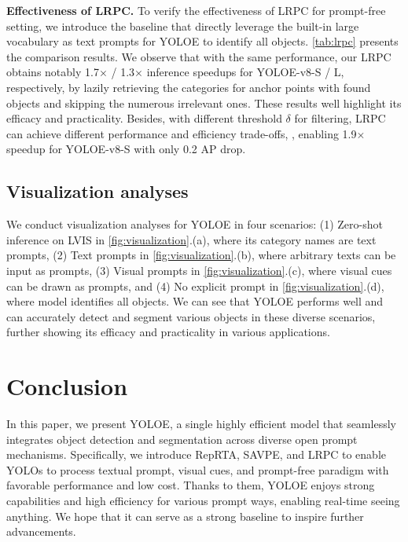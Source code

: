 \documentclass[10pt,twocolumn,letterpaper]{article}
\begin{document}
\textbf{Effectiveness of LRPC.} To verify the effectiveness of LRPC for prompt-free setting, we introduce the baseline that directly leverage the built-in large vocabulary as text prompts for YOLOE to identify all objects. \cref{tab:lrpc} presents the comparison results. We observe that with the same performance, our LRPC obtains notably 1.7$\times$ / 1.3$\times$ inference speedups for YOLOE-v8-S / L, respectively, by lazily retrieving the categories for anchor points with found objects and skipping the numerous irrelevant ones. These results well highlight its efficacy and practicality. Besides, with different threshold $\delta$ for filtering, LRPC can achieve different performance and efficiency trade-offs, \eg, enabling 1.9$\times$ speedup for YOLOE-v8-S with only 0.2 AP drop.

\subsection{Visualization analyses}
We conduct visualization analyses for YOLOE in four scenarios: (1) Zero-shot inference on LVIS in \cref{fig:visualization}.(a), where its category names are text prompts, (2) Text prompts in \cref{fig:visualization}.(b), where arbitrary texts can be input as prompts, (3) Visual prompts in \cref{fig:visualization}.(c), where visual cues can be drawn as prompts, and (4) No explicit prompt in \cref{fig:visualization}.(d), where model identifies all objects. We can see that YOLOE performs well and can accurately detect and segment various objects in these diverse scenarios, further showing its efficacy and practicality in various applications.









\section{Conclusion}
In this paper, we present YOLOE, a single highly efficient model that seamlessly integrates object detection and segmentation across diverse open prompt mechanisms. Specifically, we introduce RepRTA, SAVPE, and LRPC to enable YOLOs to process textual prompt, visual cues, and prompt-free paradigm with favorable performance and low cost. Thanks to them, YOLOE enjoys strong capabilities and high efficiency for various prompt ways, enabling real-time seeing anything. We hope that it can serve as a strong baseline to inspire further advancements.
\end{document}
